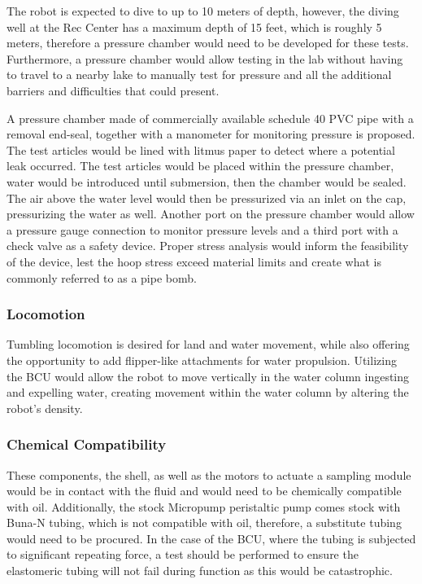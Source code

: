 The robot is expected to dive to up to 10 meters of depth, however, the diving well at the Rec Center has a maximum depth of 15 feet, which is roughly 5 meters, therefore a pressure chamber would need to be developed for these tests. Furthermore, a pressure chamber would allow testing in the lab without having to travel to a nearby lake to manually test for pressure and all the additional barriers and difficulties that could present.

A pressure chamber made of commercially available schedule 40 PVC pipe with a removal end-seal, together with a manometer for monitoring pressure is proposed. The test articles would be lined with litmus paper to detect where a potential leak occurred. The test articles would be placed within the pressure chamber, water would be introduced until submersion, then the chamber would be sealed. The air above the water level would then be pressurized via an inlet on the cap, pressurizing the water as well. Another port on the pressure chamber would allow a pressure gauge connection to monitor pressure levels and a third port with a check valve as a safety device. Proper stress analysis would inform the feasibility of the device, lest the hoop stress exceed material limits and create what is commonly referred to as a pipe bomb.  

\subsubsection{Locomotion}

Tumbling locomotion is desired for land and water movement, while also offering the opportunity to add flipper-like attachments for water propulsion. Utilizing the BCU would allow the robot to move vertically in the water column ingesting and expelling water, creating movement within the water column by altering the robot's density. 


\subsubsection{Chemical Compatibility}

These components, the shell, as well as the motors to actuate a sampling module would be in contact with the fluid and would need to be chemically compatible with oil. Additionally, the stock Micropump peristaltic pump comes stock with Buna-N tubing, which is not compatible with oil, therefore, a substitute tubing would need to be procured. In the case of the BCU, where the tubing is subjected to significant repeating force, a test should be performed to ensure the elastomeric tubing will not fail during function as this would be catastrophic. 


